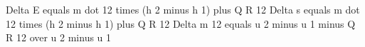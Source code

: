Delta E equals m dot 12 times (h 2 minus h 1) plus Q R 12
Delta s equals m dot 12 times (h 2 minus h 1) plus Q R 12
Delta m 12 equals u 2 minus u 1 minus Q R 12 over u 2 minus u 1